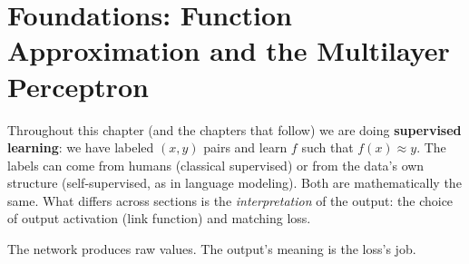 
\chapter[Foundations]{Foundations: Function Approximation and the Multilayer Perceptron}%
\label{ch:foundations}

Throughout this chapter (and the chapters that follow) we are doing
\textbf{supervised learning}: we have labeled $(x, y)$ pairs and learn $f$
such that $f(x) \approx y$. The labels can come from humans (classical
supervised) or from the data's own structure (self-supervised, as in
language modeling). Both are mathematically the same. What differs across
sections is the \emph{interpretation} of the output: the choice of
output activation (link function) and matching loss.

The network produces raw values. The output's meaning is the loss's job.








